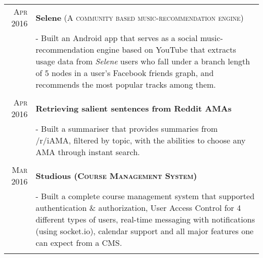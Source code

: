 \documentclass[a4paper,10pt]{extarticle} %
\begin{document}
\begin{tabular}{r|p{17.5cm}}
\textsc{Apr 2016} & \textbf{Selene} \textsc{(A community based music-recommendation engine)} \\
& \footnotesize{- Built an Android app that serves as a social music-recommendation engine based on YouTube that extracts usage data from {\itshape{Selene}} users who fall under a branch length of 5 nodes in a user's Facebook friends graph, and recommends the most popular tracks among them.}\\
\multicolumn{2}{c}{} \\

\textsc{Apr 2016} & \textbf{Retrieving salient sentences from Reddit AMAs} \\
& \footnotesize{- Built a summariser that provides summaries from /r/iAMA, filtered by topic, with the abilities to choose any AMA through instant search.}\\
\multicolumn{2}{c}{} \\

\textsc{Mar 2016} & \textbf{Studious \textsc{(Course Management System)}}\\
& \footnotesize{- Built a complete course management system that supported authentication \& authorization, User Access Control for 4 different types of users, real-time messaging with notifications (using socket.io), calendar support and all major features one can expect from a CMS.}\\
\multicolumn{2}{c}{} \\


\end{tabular}
\end{document}
